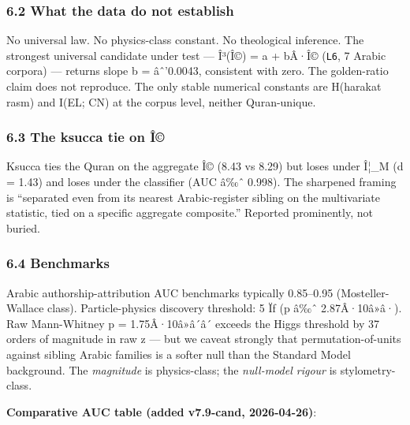 \documentclass[
]{article}
\begin{document}
\subsubsection{6.2 What the data do not
establish}\label{what-the-data-do-not-establish}

No universal law. No physics-class constant. No theological inference.
The strongest universal candidate under test --- Î³(Î©) = a + bÂ·Î©
(\texttt{L6}, 7 Arabic corpora) --- returns slope b = âˆ'0.0043,
consistent with zero. The golden-ratio claim does not reproduce. The
only stable numerical constants are H(harakat \textbar{} rasm) and I(EL;
CN) at the corpus level, neither Quran-unique.

\subsubsection{6.3 The ksucca tie on Î©}\label{the-ksucca-tie-on-uxee}

Ksucca ties the Quran on the aggregate Î© (8.43 vs 8.29) but loses under
Î¦\_M (d = 1.43) and loses under the classifier (AUC â‰ˆ 0.998). The
sharpened framing is ``separated even from its nearest Arabic-register
sibling on the multivariate statistic, tied on a specific aggregate
composite.'' Reported prominently, not buried.

\subsubsection{6.4 Benchmarks}\label{benchmarks}

Arabic authorship-attribution AUC benchmarks typically 0.85--0.95
(Mosteller-Wallace class). Particle-physics discovery threshold: 5 Ïƒ (p
â‰ˆ 2.87Â·10â»â·). Raw Mann-Whitney p = 1.75Â·10â»â´â´ exceeds the Higgs
threshold by 37 orders of magnitude in raw z --- but we caveat strongly
that permutation-of-units against sibling Arabic families is a softer
null than the Standard Model background. The \emph{magnitude} is
physics-class; the \emph{null-model rigour} is stylometry-class.

\textbf{Comparative AUC table (added v7.9-cand, 2026-04-26)}:
\end{document}
